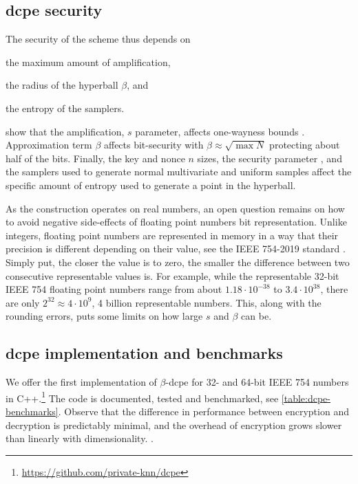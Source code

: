 			

		\subsection{\texorpdfstring{\acrshort{dcpe}}{DCPE} security}

			The security of the scheme thus depends on
			\begin{enumerate*}[label={(\roman*)}]
				\item the maximum amount of amplification,
				\item the radius of the hyperball $\beta$, and
				\item the entropy of the samplers.
			\end{enumerate*}
			\textcite{dcpe} show that the amplification, $s$ parameter, affects one-wayness bounds \cite[Section 7.2]{dcpe}.
			Approximation term $\beta$ affects bit-security with $\beta \approx \sqrt{\max N}$ protecting about half of the bits.
			Finally, the key \key{} and nonce $n$ sizes, the security parameter \secparam{}, and the samplers used to generate normal multivariate and uniform samples affect the specific amount of entropy used to generate a point in the hyperball.

			As the construction operates on real numbers, an open question remains on how to avoid negative side-effects of floating point numbers bit representation.
			Unlike integers, floating point numbers are represented in memory in a way that their precision is different depending on their value, see the IEEE 754-2019 standard \cite{ieee-floating-point}. %
			Simply put, the closer the value is to zero, the smaller the difference between two consecutive representable values is.
			For example, while the representable 32-bit IEEE 754 floating point numbers range from about $1.18 \cdot 10^{-38}$ to $3.4 \cdot 10^{38}$, there are only $2^{32} \approx 4 \cdot 10^9$, 4 billion representable numbers.
			This, along with the rounding errors, puts some limits on how large $s$ and $\beta$ can be.

		\subsection{\texorpdfstring{\acrshort{dcpe}}{DCPE} implementation and benchmarks}

			We offer the first implementation of \cite{dcpe} $\beta$-\acrshort{dcpe} for 32- and 64-bit IEEE 754 numbers in C++.\footnote{
				\url{https://github.com/private-knn/dcpe}
			}
			The code is documented, tested and benchmarked, see \cref{table:dcpe-benchmarks}.
			Observe that the difference in performance between encryption and decryption is predictably minimal, and the overhead of encryption grows slower than linearly with dimensionality.
.
			

